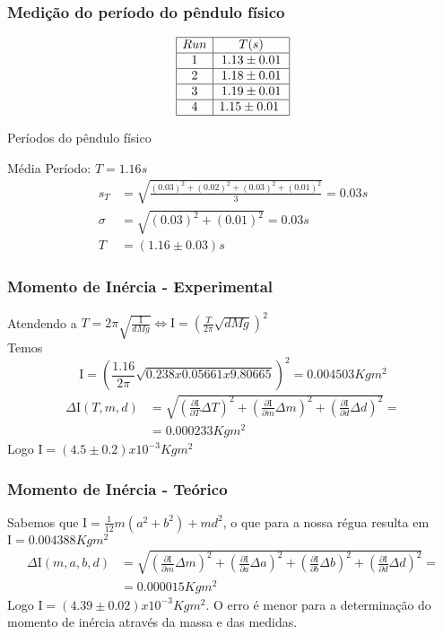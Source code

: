 \documentclass{beamer}
\begin{document}
\begin{frame}
	\frametitle{Medição do período do pêndulo físico}
	\begin{table} [h]
	$$\begin{array}{|c|c|} \hline
	Run & T(s) \\ \hline
	1 & 1.13\pm0.01 \\ \hline
	2 & 1.18\pm0.01 \\ \hline
	3 & 1.19\pm0.01 \\ \hline
	4 & 1.15\pm0.01\ \\ \hline
	\end{array}$$
	\caption{Períodos do pêndulo físico}
	\end{table}
	
	Média Período: $T=1.16s$
	\begin{equation}
	\begin{split}
	 s_T&=\sqrt{\frac{(0.03)^2+(0.02)^2+(0.03)^2+(0.01)^2}{3}}=0.03s \\
	 \sigma&=\sqrt{(0.03)^2+(0.01)^2}=0.03s \\
	 T&=(1.16\pm0.03)s \nonumber
	 \end{split}
	\end{equation}
\end{frame}

\begin{frame}
	\frametitle{Momento de Inércia - Experimental}
	Atendendo a $T=2\pi\sqrt{\frac{\mathrm{I}}{dMg}} \iff \mathrm{I}=\left(\frac{T}{2\pi}\sqrt{dMg}\right)^2$ \\
	Temos $$ \mathrm{I}=\left(\frac{1.16}{2\pi}\sqrt{0.238x0.05661x9.80665}\right)^2 = 0.004503Kgm^2$$ 
	\begin{equation}
	\begin{split}
	 \Delta\mathrm{I}(T,m,d)&=\sqrt{\left(\frac{\partial\mathrm{I}}{\partial T}\Delta T\right)^2+\left(\frac{\partial\mathrm{I}}{\partial m}\Delta m\right)^2+\left(\frac{\partial\mathrm{I}}{\partial d}\Delta d\right)^2}= \\ 
	 &= 0.000233Kgm^2 \nonumber
	 \end{split}
	\end{equation}
	Logo $ \mathrm{I}=(4.5\pm0.2)x10^{-3}Kgm^2$
\end{frame}

\begin{frame}
	\frametitle{Momento de Inércia - Teórico}
	Sabemos que $ \mathrm{I}=\frac{1}{12}m(a^2+b^2)+md^2$, o que para a nossa régua resulta em $ \mathrm{I}=0.004388Kgm^2$
	\begin{equation}
	\begin{split}
	 \Delta\mathrm{I}(m,a,b,d)&=\sqrt{\left(\frac{\partial\mathrm{I}}{\partial m}\Delta m\right)^2+\left(\frac{\partial\mathrm{I}}{\partial a}\Delta a\right)^2 
	 +\left(\frac{\partial\mathrm{I}}{\partial b}\Delta b\right)^2+\left(\frac{\partial\mathrm{I}}{\partial d}\Delta d\right)^2}= \\ 
	 &= 0.000015Kgm^2 \nonumber
	 \end{split}
	\end{equation}
	Logo  $ \mathrm{I}=(4.39\pm0.02)x10^{-3}Kgm^2$.
	O erro é menor para a determinação do momento de inércia através da massa e das medidas.
\end{frame}
\end{document}
